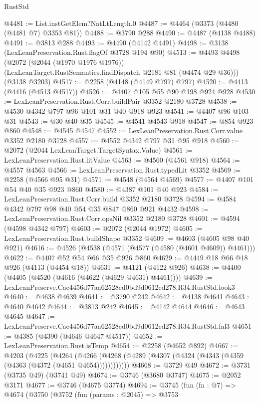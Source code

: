 \begin{lexlean}{RustStd}
\begin{coremodule}
@4481 := List.instGetElem?NatLtLength.{0}
@4487 := @4464 (@3373 (@4480 (@4481 @7) @3353 @81))
@4488 := @3790 @288
@4490 := @4487 (@4138 @4488)
@4491 := @3813 @288
@4493 := @4490 (@4142 @4491)
@4498 := @3138 (LexLeanPreservation.Rust.flagOf @3728 @194 @90)
@4513 := @4493
    @4498
    (@2072
      (@2044 (@1970 @1976 @1976))
      (LexLeanTarget.RustSemantics.findDispatch @2181 @81 (@4474 @29 @36)))
    (@3138 @3203)
@4517 := @2258 (@4148 (@4149 @797) @797)
@4520 := @4413 (@4416 (@4513 @4517))
@4526 := @4407 @105 @55 @90 @198 @924 @928
@4530 := LexLeanPreservation.Rust.Corr.buildPair @3352 @2180 @3728
@4538 := @4530 @4342 @797 @96 @101 @31 @40 @918 @923
@4541 := @4407 @96 @103 @31
@4543 := @30 @40 @35
@4545 := @4541 @4543 @918
@4547 := @854 @923 @860
@4548 := @4545 @4547
@4552 := LexLeanPreservation.Rust.Corr.value @3352 @2180 @3728
@4557 := @4552 @4342 @797 @31 @95 @918
@4560 := @2072 (@2044 LexLeanTarget.TargetSyntax.Value)
@4561 := LexLeanPreservation.Rust.litValue
@4563 := @4560 (@4561 @918)
@4564 := @4557 @4563
@4566 := LexLeanPreservation.Rust.typedLit @3352
@4569 := @2258 (@4566 @95 @31)
@4571 := @4548 (@4564 @4569)
@4577 := @4407 @101 @54 @40 @35 @923 @860
@4580 := @4387 @101 @40 @923
@4584 := LexLeanPreservation.Rust.Corr.build @3352 @2180 @3728
@4594 := @4584 @4342 @797 @98 @40 @54 @35 @847 @860 @921 @4432
@4598 := LexLeanPreservation.Rust.Corr.opsNil @3352 @2180 @3728
@4601 := @4594 (@4598 @4342 @797)
@4603 := @2072 (@2044 @1972)
@4605 := LexLeanPreservation.Rust.buildShape @3352
@4609 := @4603 (@4605 @98 @40 @921)
@4616 := @4526 (@4538 (@4571 (@4577 (@4580 (@4601 @4609)) @4461)))
@4622 := @4407 @52 @54 @66 @35 @926 @860
@4629 := @4449 @18 @66 @18 @926 (@4113 (@4454 @18))
@4631 := @4121 (@4122 @926)
@4638 := @4400 (@4405 (@4520 (@4616 (@4622 (@4629 @4631) @4461))))
@4639 := LexLeanPreserve.Cae4456d77aa62528ed0bd9d0612cd278.R34.RustStd.look3
@4640 := @4638 @4639
@4641 := @3790 @242
@4642 := @4138 @4641
@4643 := @4640 @4642
@4644 := @3813 @242
@4645 := @4142 @4644
@4646 := @4643 @4645
@4647 := LexLeanPreserve.Cae4456d77aa62528ed0bd9d0612cd278.R34.RustStd.fal3
@4651 := @4385 (@4390 (@4646 @4647 @4517))
@4652 := LexLeanPreservation.Rust.isTemp
@4654 := @2258 (@4652 @892)
@4667 := @4203
    (@4225
      (@4264 (@4266 (@4268 (@4289 (@4307 (@4324 (@4343 (@4359 (@4363 (@4372 (@4651 @4654))))))))))))
@4668 := @3729 @49
@4672 := @3731 (@3735 @49) (@3741 @49)
@4674 := @3746 (@3680 @3747)
@4675 := @2052 @3171
@4677 := @3746 (@4675 @3774)
@4694 := @3745
    (fun (fn : @7) =>
    @4674
      (@3750
        (@3752
          (fun (params : @2045) =>
          @3753

\end{coremodule}
\end{lexlean}
